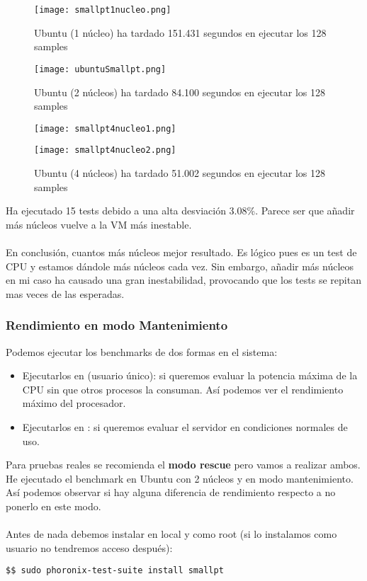 \begin{figure}[H]
	\centering
	\texttt{[image: smallpt1nucleo.png]}
	\caption{Ubuntu (1 núcleo) ha tardado 151.431 segundos en ejecutar los 128 samples}
\end{figure}
\begin{figure}[H]
	\centering
	\texttt{[image: ubuntuSmallpt.png]}
	\caption{Ubuntu (2 núcleos) ha tardado 84.100 segundos en ejecutar los 128 samples}
\end{figure}
\begin{figure}[H]
	\centering
	\texttt{[image: smallpt4nucleo1.png]}
\end{figure}
\begin{figure}[H]
	\centering
	\texttt{[image: smallpt4nucleo2.png]}
	\caption{Ubuntu (4 núcleos) ha tardado 51.002 segundos en ejecutar los 128 samples}
\end{figure}
Ha ejecutado 15 tests debido a una alta desviación 3.08\%. Parece ser que añadir más núcleos vuelve a la VM más inestable.\\\\
En conclusión, cuantos más núcleos mejor resultado. Es lógico pues es un test de CPU y estamos dándole más núcleos cada vez. Sin embargo, añadir más núcleos en mi caso ha causado una gran inestabilidad, provocando que los tests se repitan mas veces de las esperadas.
\subsubsection{Rendimiento en modo Mantenimiento}
Podemos ejecutar los benchmarks de dos formas en el sistema:
\begin{itemize}
	\item Ejecutarlos en  (usuario único): si queremos evaluar la potencia máxima de la CPU sin que otros procesos la consuman. Así podemos ver el rendimiento máximo del procesador.
	
	\item Ejecutarlos en : si queremos evaluar el servidor en condiciones normales de uso.
\end{itemize}

Para pruebas reales se recomienda el \textbf{modo rescue} pero vamos a realizar ambos.
He ejecutado el benchmark en Ubuntu con 2 núcleos y en modo mantenimiento. Así podemos observar si hay alguna diferencia de rendimiento respecto a no ponerlo en este modo.
\\\\
Antes de nada debemos instalar  en local y como root (si lo instalamos como usuario no tendremos acceso después):
\begin{verbatim}
$$ sudo phoronix-test-suite install smallpt
\end{verbatim}

